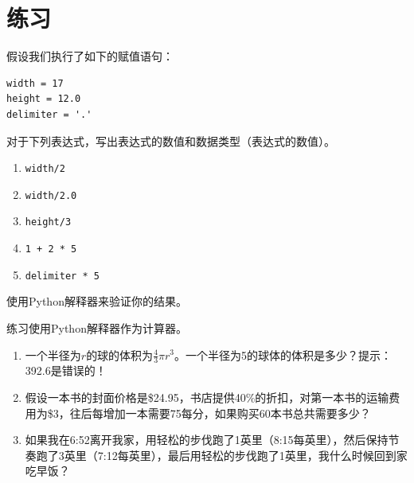 \section{练习}

\begin{ex}
假设我们执行了如下的赋值语句：

\begin{verbatim}
width = 17
height = 12.0
delimiter = '.'
\end{verbatim}

对于下列表达式，写出表达式的数值和数据类型（表达式的数值）。

\begin{enumerate}

\item {\tt width/2}

\item {\tt width/2.0}

\item {\tt height/3}

\item {\tt 1 + 2 * 5}

\item {\tt delimiter * 5}

\end{enumerate}

使用Python解释器来验证你的结果。
\end{ex}

\begin{ex}
练习使用Python解释器作为计算器。

\begin{enumerate}

\item 一个半径为$r$的球的体积为$\frac{4}{3} \pi r^3$。一个半径为5的球体的体积是多少？提示：392.6是错误的！

\item 假设一本书的封面价格是\$24.95，书店提供40\%的折扣，对第一本书的运输费用为\$3，往后每增加一本需要75每分，如果购买60本书总共需要多少？

\item 如果我在6:52离开我家，用轻松的步伐跑了1英里（8:15每英里），然后保持节奏跑了3英里（7:12每英里），最后用轻松的步伐跑了1英里，我什么时候回到家吃早饭？


\end{enumerate}
\end{ex}

